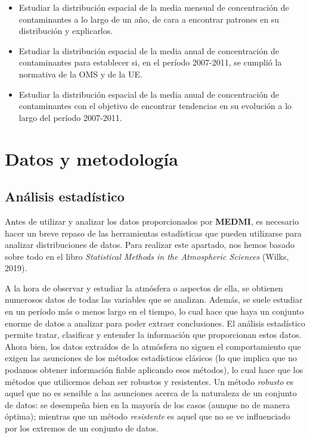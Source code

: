 \documentclass[12pt]{article}
\begin{document}
\begin{itemize}
\item Estudiar la distribución espacial de la media mensual de concentración de contaminantes a lo largo de un año, de cara a encontrar patrones en su distribución y explicarlos.

\item Estudiar la distribución espacial de la media anual de concentración de contaminantes para establecer si, en el período 2007-2011, se cumplió la normativa de la OMS y de la UE.

\item Estudiar la distribución espacial de la media anual de concentración de contaminantes con el objetivo de encontrar tendencias en su evolución a lo largo del período 2007-2011.
\end{itemize}

\newpage

\section{Datos y metodología}

\subsection{Análisis estadístico}

Antes de utilizar y analizar los datos proporcionados por \textbf{MEDMI}, es necesario hacer un breve repaso de las herramientas estadísticas que pueden utilizarse para analizar distribuciones de datos. Para realizar este apartado, nos hemos basado sobre todo en el libro \textit{Statistical Methods in the Atmospheric Sciences} (Wilks, 2019).

A la hora de observar y estudiar la atmósfera o aspectos de ella, se obtienen numerosos datos de todas las variables que se analizan. Además, se suele estudiar en un período más o menos largo en el tiempo, lo cual hace que haya un conjunto enorme de datos a analizar para poder extraer conclusiones. El análisis estadístico permite tratar, clasificar y entender la información que proporcionan estos datos. Ahora bien, los datos extraídos de la atmósfera no siguen el comportamiento que exigen las asunciones de los métodos estadísticos clásicos (lo que implica que no podamos obtener información fiable aplicando esos métodos), lo cual hace que los métodos que utilicemos deban ser robustos y resistentes. Un método \textit{robusto} es aquel que no es sensible a las asunciones acerca de la naturaleza de un conjunto de datos: se desempeña bien en la mayoría de los casos (aunque no de manera óptima); mientras que un método \textit{resistente} es aquel que no se ve influenciado por los extremos de un conjunto de datos.
\end{document}
